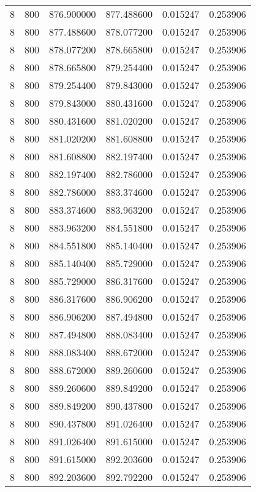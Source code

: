 \begin{longtable}{rrrrrr}
8 & 800 & 876.900000 & 877.488600 & 0.015247 & 0.253906 \\
8 & 800 & 877.488600 & 878.077200 & 0.015247 & 0.253906 \\
8 & 800 & 878.077200 & 878.665800 & 0.015247 & 0.253906 \\
8 & 800 & 878.665800 & 879.254400 & 0.015247 & 0.253906 \\
8 & 800 & 879.254400 & 879.843000 & 0.015247 & 0.253906 \\
8 & 800 & 879.843000 & 880.431600 & 0.015247 & 0.253906 \\
8 & 800 & 880.431600 & 881.020200 & 0.015247 & 0.253906 \\
8 & 800 & 881.020200 & 881.608800 & 0.015247 & 0.253906 \\
8 & 800 & 881.608800 & 882.197400 & 0.015247 & 0.253906 \\
8 & 800 & 882.197400 & 882.786000 & 0.015247 & 0.253906 \\
8 & 800 & 882.786000 & 883.374600 & 0.015247 & 0.253906 \\
8 & 800 & 883.374600 & 883.963200 & 0.015247 & 0.253906 \\
8 & 800 & 883.963200 & 884.551800 & 0.015247 & 0.253906 \\
8 & 800 & 884.551800 & 885.140400 & 0.015247 & 0.253906 \\
8 & 800 & 885.140400 & 885.729000 & 0.015247 & 0.253906 \\
8 & 800 & 885.729000 & 886.317600 & 0.015247 & 0.253906 \\
8 & 800 & 886.317600 & 886.906200 & 0.015247 & 0.253906 \\
8 & 800 & 886.906200 & 887.494800 & 0.015247 & 0.253906 \\
8 & 800 & 887.494800 & 888.083400 & 0.015247 & 0.253906 \\
8 & 800 & 888.083400 & 888.672000 & 0.015247 & 0.253906 \\
8 & 800 & 888.672000 & 889.260600 & 0.015247 & 0.253906 \\
8 & 800 & 889.260600 & 889.849200 & 0.015247 & 0.253906 \\
8 & 800 & 889.849200 & 890.437800 & 0.015247 & 0.253906 \\
8 & 800 & 890.437800 & 891.026400 & 0.015247 & 0.253906 \\
8 & 800 & 891.026400 & 891.615000 & 0.015247 & 0.253906 \\
8 & 800 & 891.615000 & 892.203600 & 0.015247 & 0.253906 \\
8 & 800 & 892.203600 & 892.792200 & 0.015247 & 0.253906 \\

\end{longtable}
